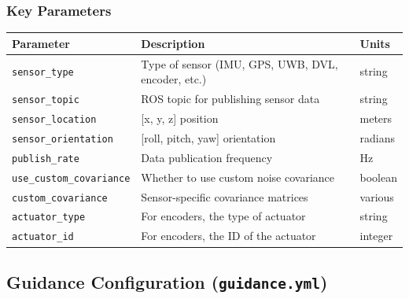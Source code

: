 \documentclass[
  letterpaper,
  DIV=11,
  numbers=noendperiod]{scrreprt}
\begin{document}
\subsubsection*{Key Parameters}\label{key-parameters-7}

\begin{longtable}[]{@{}
  >{\raggedright\arraybackslash}p{}
  >{\raggedright\arraybackslash}p{}
  >{\raggedright\arraybackslash}p{}@{}}
\toprule\noalign{}
\begin{minipage}[b]{\linewidth}\raggedright
Parameter
\end{minipage} & \begin{minipage}[b]{\linewidth}\raggedright
Description
\end{minipage} & \begin{minipage}[b]{\linewidth}\raggedright
Units
\end{minipage} \\
\midrule\noalign{}
\endhead
\bottomrule\noalign{}
\endlastfoot
\texttt{sensor\_type} & Type of sensor (IMU, GPS, UWB, DVL, encoder,
etc.) & string \\
\texttt{sensor\_topic} & ROS topic for publishing sensor data &
string \\
\texttt{sensor\_location} & {[}x, y, z{]} position & meters \\
\texttt{sensor\_orientation} & {[}roll, pitch, yaw{]} orientation &
radians \\
\texttt{publish\_rate} & Data publication frequency & Hz \\
\texttt{use\_custom\_covariance} & Whether to use custom noise
covariance & boolean \\
\texttt{custom\_covariance} & Sensor-specific covariance matrices &
various \\
\texttt{actuator\_type} & For encoders, the type of actuator & string \\
\texttt{actuator\_id} & For encoders, the ID of the actuator &
integer \\
\end{longtable}

\subsection*{\texorpdfstring{Guidance Configuration
(\texttt{guidance.yml})}{Guidance Configuration (guidance.yml)}}\label{guidance-configuration-guidance.yml}
\end{document}
